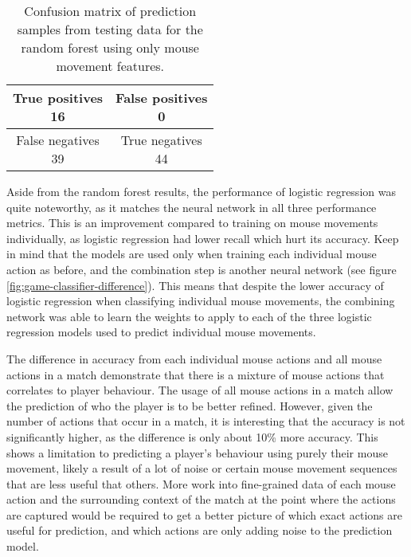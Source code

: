 \documentclass[Report.tex]{subfiles}
\begin{document}
\begin{table}[H]
\centering
\begin{tabular}{| c | c |}
\hline
\makecell{True positives \\ 16} & \makecell{False positives \\ 0} \\ \hline
\makecell{False negatives \\ 39} & \makecell{True negatives \\ 44} \\ \hline
\end{tabular}
\caption{Confusion matrix of prediction samples from testing data for the random forest using only mouse movement features.}
\label{tbl:rf-mouse-confusion-matrix}
\end{table}

Aside from the random forest results, the performance of logistic regression was quite noteworthy, as it matches the neural network in all three performance metrics. This is an improvement compared to training on mouse movements individually, as logistic regression had lower recall which hurt its accuracy. Keep in mind that the models are used only when training each individual mouse action as before, and the combination step is another neural network (see figure \ref{fig:game-classifier-difference}). This means that despite the lower accuracy of logistic regression when classifying individual mouse movements, the combining network was able to learn the weights to apply to each of the three logistic regression models used to predict individual mouse movements. 

The difference in accuracy from each individual mouse actions and all mouse actions in a match demonstrate that there is a mixture of mouse actions that correlates to player behaviour. The usage of all mouse actions in a match allow the prediction of who the player is to be better refined. However, given the number of actions that occur in a match, it is interesting that the accuracy is not significantly higher, as the difference is only about 10\% more accuracy. This shows a limitation to predicting a player's behaviour using purely their mouse movement, likely a result of a lot of noise or certain mouse movement sequences that are less useful that others. More work into fine-grained data of each mouse action and the surrounding context of the match at the point where the actions are captured would be required to get a better picture of which exact actions are useful for prediction, and which actions are only adding noise to the prediction model. 
\end{document}
